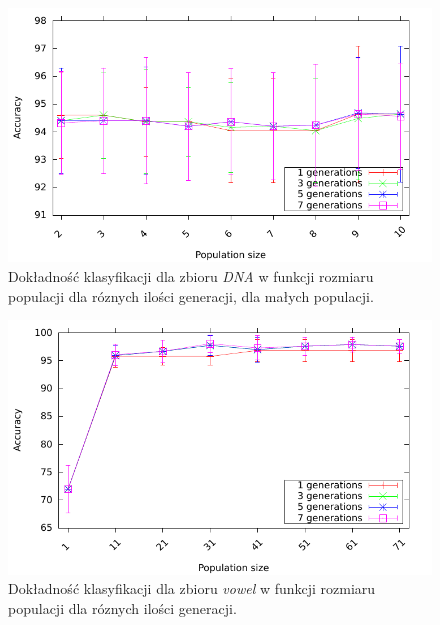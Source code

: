 	\begin{figure}
		\includegraphics[scale=0.90]{figures/accuracy/accuracy-dna-detailed}
		\caption{Dokładność klasyfikacji dla zbioru \emph{DNA} w funkcji rozmiaru populacji dla róznych ilości generacji, dla małych populacji.\label{fig:acc-dna-detailed}}
	\end{figure}	
	

	\begin{figure}
		\includegraphics[scale=0.90]{figures/accuracy/accuracy-vowel}
		\caption{Dokładność klasyfikacji dla zbioru \emph{vowel} w funkcji rozmiaru populacji dla róznych ilości generacji.\label{fig:acc-vowel}}
	\end{figure}
		
